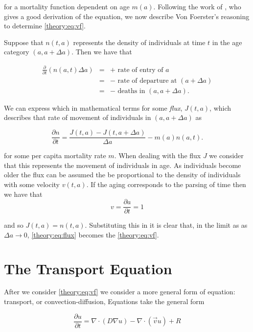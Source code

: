 \documentclass[../main]{subfiles}
\begin{document}
  for a mortality function dependent on age $m(a)$. Following the work of \cite{trucco1965}, who gives a good derivation of the equation, we now describe Von Foerster's reasoning to determine \autoref{theory:eq:vf}.

  Suppose that $n(t, a)$ represents the density of individuals at time $t$ in the age category $(a, a + \Delta a)$. Then we have that

  \begin{eqnarray}
    \frac{\partial}{\partial t} \left( n(a, t) \Delta a \right)
    &=& + \mbox{ rate of entry of } a \nonumber \\
    &=& - \mbox{ rate of departure at } (a + \Delta a) \nonumber \\
    &=& - \mbox{ deaths in } (a, a + \Delta a).
  \end{eqnarray}

  We can express which in mathematical terms for some \emph{flux}, $J(t, a)$, which describes that rate of movement of individuals in $(a, a + \Delta a)$ as

  \begin{equation}\label{theory:eq:flux}
    \frac{\partial n}{\partial t} = \frac{J(t, a) - J(t, a + \Delta a)}{\Delta a} - m(a) n(a, t).
  \end{equation}

  for some per capita mortality rate $m$. When dealing with the flux $J$ we consider that this represents the movement of individuals in age. As individuals become older the flux can be assumed the be proportional to the density of individuals with some velocity $v(t, a)$. If the aging corresponds to the parsing of time then we have that
  $$ v = \frac{\partial a}{\partial t} = 1$$

  and so $J(t, a) = n(t, a)$. Substituting this in it is clear that, in the limit as as $\Delta a \to 0$, \autoref{theory:eq:flux} becomes the \autoref{theory:eq:vf}.

  \section{The Transport Equation}\label{theory:sec:transport}
  After we consider \autoref{theory:eq:vf} we consider a more general form of equation: transport, or convection-diffusion, Equations take the general form

  \begin{equation}\label{theory:eq:transport}
    \frac{\partial u}{\partial t} = \nabla \cdot (D \nabla u) - \nabla \cdot (\vec{v} u) + R
  \end{equation}
\end{document}
